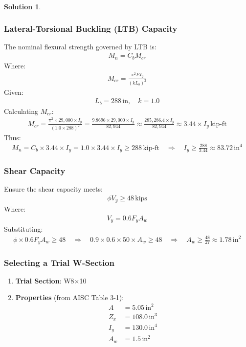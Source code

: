 \documentclass[12pt]{article}
\theoremstyle{definition} %
\newtheorem{solution}{Solution}
\theoremstyle{plain} %
\begin{document}
\begin{solution}
\begin{enumerate}
\subsubsection*{Lateral-Torsional Buckling (LTB) Capacity}
The nominal flexural strength governed by LTB is:
\begin{align}
M_n = C_b M_{cr}
\end{align}
Where:
\begin{align}
M_{cr} = \frac{\pi^2 E I_y}{(k L_b)^2}
\end{align}
Given:
\begin{align}
L_b = 288 \, \text{in}, \quad k = 1.0
\end{align}
Calculating \( M_{cr} \):
\begin{align}
M_{cr} = \frac{\pi^2 \times 29{,}000 \times I_y}{(1.0 \times 288)^2} = \frac{9.8696 \times 29{,}000 \times I_y}{82{,}944} \approx \frac{285{,}286.4 \times I_y}{82{,}944} \approx 3.44 \times I_y \, \text{kip-ft}
\end{align}
Thus:
\begin{align}
M_n = C_b \times 3.44 \times I_y = 1.0 \times 3.44 \times I_y \geq 288 \, \text{kip-ft} \quad \Rightarrow \quad I_y \geq \frac{288}{3.44} \approx 83.72 \, \text{in}^4
\end{align}

\subsubsection*{Shear Capacity}
Ensure the shear capacity meets:
\begin{align}
\phi V_y \geq 48 \, \text{kips}
\end{align}
Where:
\begin{align}
V_y = 0.6 F_y A_w
\end{align}
Substituting:
\begin{align}
\phi \times 0.6 F_y A_w \geq 48 \quad \Rightarrow \quad 0.9 \times 0.6 \times 50 \times A_w \geq 48 \quad \Rightarrow \quad A_w \geq \frac{48}{27} \approx 1.78 \, \text{in}^2
\end{align}

\subsubsection*{Selecting a Trial W-Section}
\begin{enumerate}
    \item \textbf{Trial Section}: W8$\times$10
    \item \textbf{Properties} (from AISC Table 3-1):
    \begin{align*}
    A &= 5.05 \, \text{in}^2 \\
    Z_x &= 108.0 \, \text{in}^3 \\
    I_y &= 130.0 \, \text{in}^4 \\
    A_w &= 1.5 \, \text{in}^2 \\
    \end{align*}
\end{enumerate}


\end{enumerate}
\end{solution}
\end{document}
